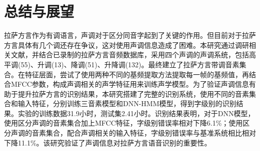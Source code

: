 ﻿%

\chapter{总结与展望}
拉萨方言作为有调语言，声调对于区分同音字起到了关键的作用。但目前对于拉萨方言具体有几个调还存在争议，这对使用声调信息造成了困难。本研究通过调研相关文献，并结合已录制的拉萨方言音频数据库，采用四个声调的声调系统，包括高平调(55)、升调(13)、降调(51)、升降调(132)。最终建立了拉萨方言带调音素集合。在特征层面，尝试了使用两种不同的基频提取方法提取每一帧的基频值，再结合MFCC参数，构成声调相关的声学特征用来训练声学模型。为了验证声调信息有助于提升拉萨方言的识别结果，本研究搭建了完整的识别系统，使用不同的音素集合和输入特征，分别训练三音素模型和DNN-HMM模型，得到字级别的识别结果。实验的训练数据31.9小时，测试集2.41小时。识别结果表明，对于DNN模型，使用区分声调的音素集合加上MFCC特征，字级别错误率相对下降6.1\%；使用区分声调的音素集合，配合声调相关的输入特征，字级别错误率与基准系统相比相对下降11.1\%。该研究验证了声调信息对拉萨方言语音识别的重要性。
